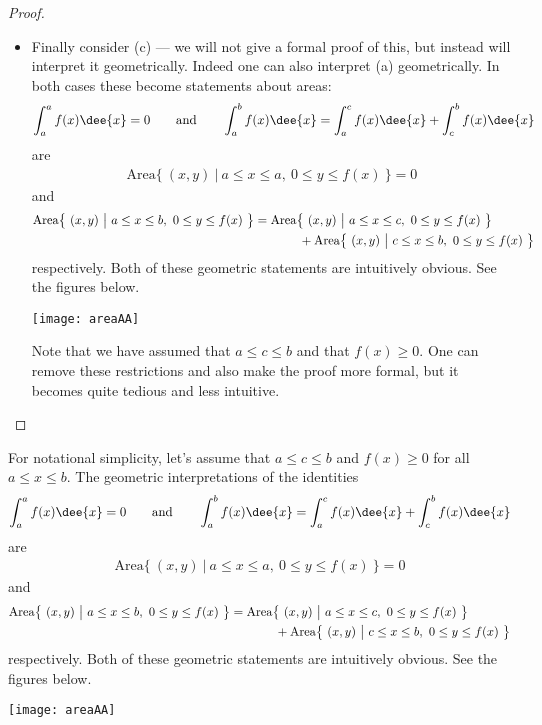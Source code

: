 \begin{proof}
\begin{itemize}
\item Finally consider (c) --- we will not give a formal proof of this, but
instead will interpret it geometrically. Indeed one can also interpret (a)
geometrically. In both cases these become statements about areas:
\begin{align*}
\int_a^a f(x)\dee{x}=0\qquad\text{and}\qquad
\int_a^b f(x)\dee{x}= \int_a^c f(x)\dee{x} + \int_c^b f(x)\dee{x}
\end{align*}
are
\begin{align*}
\text{Area}\big\{\ (x,y)\ \big|\ a\le x\le a,\ 0\le y\le f(x)\ \big\}=0
\end{align*}
and
\begin{align*}
\text{Area}\big\{\ (x,y)\ \big|\ a\le x\le b,\ 0\le y\le f(x)\ \big\}
&=\text{Area}\big\{\ (x,y)\ \big|\ a\le x\le c,\ 0\le y\le f(x)\ \big\} \\
&\hskip0.5in
+\text{Area}\big\{\ (x,y)\ \big|\ c\le x\le b,\ 0\le y\le f(x)\ \big\}
\end{align*}
respectively. Both of these geometric statements
are intuitively obvious. See the figures below.
\begin{wfig}
\begin{center}
  \texttt{[image: areaAA]}\qquad\qquad
\end{center}
\end{wfig}
Note that we have assumed that $a\leq c \leq b$ and that $f(x)\geq 0$. One can
remove
these restrictions and also make the proof more formal, but it becomes quite
tedious and
less intuitive.
\end{itemize}
\end{proof}
\begin{remark}
For notational simplicity, let's assume that $a\le c\le b$ and $f(x)\ge 0$
for all $a\le x\le b$.
The geometric interpretations of the identities
\begin{align*}
\int_a^a f(x)\dee{x}=0\qquad\text{and}\qquad
\int_a^b f(x)\dee{x}= \int_a^c f(x)\dee{x} + \int_c^b f(x)\dee{x}
\end{align*}
are
\begin{align*}
\text{Area}\big\{\ (x,y)\ \big|\ a\le x\le a,\ 0\le y\le f(x)\ \big\}=0
\end{align*}
and
\begin{align*}
\text{Area}\big\{\ (x,y)\ \big|\ a\le x\le b,\ 0\le y\le f(x)\ \big\}
&=\text{Area}\big\{\ (x,y)\ \big|\ a\le x\le c,\ 0\le y\le f(x)\ \big\} \\
&\hskip0.5in
+\text{Area}\big\{\ (x,y)\ \big|\ c\le x\le b,\ 0\le y\le f(x)\ \big\}
\end{align*}
respectively. Both of these geometric statements
are intuitively obvious. See the figures below.
\begin{wfig}
\begin{center}
  \texttt{[image: areaAA]}\qquad\qquad
\end{center}
\end{wfig}
\end{remark}



